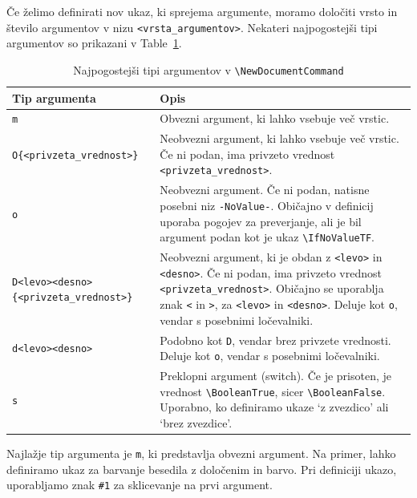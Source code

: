 Če želimo definirati nov ukaz, ki sprejema argumente, moramo določiti vrsto in število argumentov v nizu \texttt{\textless vrsta\_argumentov\textgreater }.
Nekateri najpogostejši tipi argumentov so prikazani v Table~\ref{tbl:arg-types}.

\begin{table}
\centering
\caption[]{Najpogostejši tipi argumentov v \texttt{{\textbackslash}NewDocumentCommand}}
\label{tbl:arg-types}
\begin{tabular}{p{}p{}}
\toprule
Tip argumenta & Opis \\
\hline
\texttt{m} & Obvezni argument, ki lahko vsebuje več vrstic. \\
\texttt{O\{\textless privzeta\_vrednost\textgreater \}} & Neobvezni argument, ki lahko vsebuje več vrstic. Če ni podan, ima privzeto vrednost \texttt{\textless privzeta\_vrednost\textgreater }. \\
\texttt{o} & Neobvezni argument. Če ni podan, natisne posebni niz \texttt{-NoValue-}. Običajno v definicij uporaba pogojev za preverjanje, ali je bil argument podan kot je ukaz \texttt{{\textbackslash}IfNoValueTF}. \\
\texttt{D\textless levo\textgreater \textless desno\textgreater \{\textless privzeta\_vrednost\textgreater \}} & Neobvezni argument, ki je obdan z \texttt{\textless levo\textgreater } in \texttt{\textless desno\textgreater }. Če ni podan, ima privzeto vrednost \texttt{\textless privzeta\_vrednost\textgreater }. Običajno se uporablja znak \texttt{\textless } in \texttt{\textgreater }, za \texttt{\textless levo\textgreater } in \texttt{\textless desno\textgreater }. Deluje kot \texttt{o}, vendar s posebnimi ločevalniki. \\
\texttt{d\textless levo\textgreater \textless desno\textgreater } & Podobno kot \texttt{D}, vendar brez privzete vrednosti. Deluje kot \texttt{o}, vendar s posebnimi ločevalniki. \\
\texttt{s} & Preklopni argument (switch). Če je prisoten, je vrednost \texttt{{\textbackslash}BooleanTrue}, sicer \texttt{{\textbackslash}BooleanFalse}. Uporabno, ko definiramo ukaze `z zvezdico' ali `brez zvezdice'. \\
\bottomrule
\end{tabular}
\end{table}

Najlažje tip argumenta je \texttt{m}, ki predstavlja obvezni argument. Na primer, lahko definiramo ukaz za barvanje besedila z določenim in barvo. Pri definiciji ukazo, uporabljamo znak \texttt{\#1} za sklicevanje na prvi argument.

